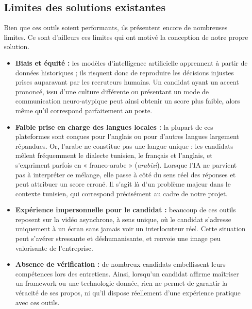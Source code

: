 \subsection{Limites des solutions existantes}

Bien que ces outils soient performants, ils présentent encore de nombreuses limites. Ce sont d’ailleurs ces limites qui ont motivé la conception de notre propre solution.

\begin{itemize}
    \item \textbf{Biais et équité :} les modèles d’intelligence artificielle apprennent à partir de données historiques ; ils risquent donc de reproduire les décisions injustes prises auparavant par les recruteurs humains. Un candidat ayant un accent prononcé, issu d’une culture différente ou présentant un mode de communication neuro-atypique peut ainsi obtenir un score plus faible, alors même qu’il correspond parfaitement au poste.

    \item \textbf{Faible prise en charge des langues locales :} la plupart de ces plateformes sont conçues pour l’anglais ou pour d’autres langues largement répandues. Or, l’arabe ne constitue pas une langue unique : les candidats mêlent fréquemment le dialecte tunisien, le français et l’anglais, et s’expriment parfois en « franco-arabe » (\textit{arabizi}). Lorsque l’IA ne parvient pas à interpréter ce mélange, elle passe à côté du sens réel des réponses et peut attribuer un score erroné. Il s’agit là d’un problème majeur dans le contexte tunisien, qui correspond précisément au cadre de notre projet.

    \item \textbf{Expérience impersonnelle pour le candidat :} beaucoup de ces outils reposent sur la vidéo asynchrone, à sens unique, où le candidat s’adresse uniquement à un écran sans jamais voir un interlocuteur réel. Cette situation peut s’avérer stressante et déshumanisante, et renvoie une image peu valorisante de l’entreprise.

    \item \textbf{Absence de vérification :} de nombreux candidats embellissent leurs compétences lors des entretiens. Ainsi, lorsqu’un candidat affirme maîtriser un framework ou une technologie donnée, rien ne permet de garantir la véracité de ses propos, ni qu’il dispose réellement d’une expérience pratique avec ces outils.
\end{itemize}

